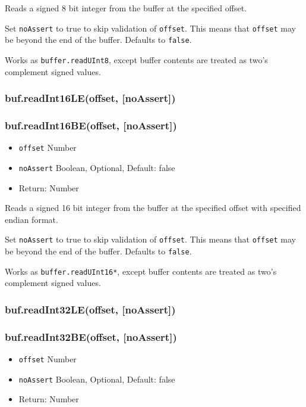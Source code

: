 Reads a signed 8 bit integer from the buffer at the specified offset.

Set \texttt{noAssert} to true to skip validation of \texttt{offset}.
This means that \texttt{offset} may be beyond the end of the buffer.
Defaults to \texttt{false}.

Works as \texttt{buffer.readUInt8}, except buffer contents are treated
as two's complement signed values.

\subsubsection{buf.readInt16LE(offset,
{[}noAssert{]})}\label{buf.readint16leoffset-noassert}

\subsubsection{buf.readInt16BE(offset,
{[}noAssert{]})}\label{buf.readint16beoffset-noassert}

\begin{itemize}
\itemsep1pt\parskip0pt
\item
  \texttt{offset} Number
\item
  \texttt{noAssert} Boolean, Optional, Default: false
\item
  Return: Number
\end{itemize}

Reads a signed 16 bit integer from the buffer at the specified offset
with specified endian format.

Set \texttt{noAssert} to true to skip validation of \texttt{offset}.
This means that \texttt{offset} may be beyond the end of the buffer.
Defaults to \texttt{false}.

Works as \texttt{buffer.readUInt16*}, except buffer contents are treated
as two's complement signed values.

\subsubsection{buf.readInt32LE(offset,
{[}noAssert{]})}\label{buf.readint32leoffset-noassert}

\subsubsection{buf.readInt32BE(offset,
{[}noAssert{]})}\label{buf.readint32beoffset-noassert}

\begin{itemize}
\itemsep1pt\parskip0pt
\item
  \texttt{offset} Number
\item
  \texttt{noAssert} Boolean, Optional, Default: false
\item
  Return: Number
\end{itemize}

